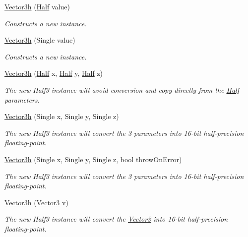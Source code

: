 \begin{DoxyCompactItemize}
\item 
\hyperlink{struct_open_t_k_1_1_vector3h_a30550f0a2648a43e00b622c8196eb6b7}{Vector3h} (\hyperlink{struct_open_t_k_1_1_half}{Half} value)
\begin{DoxyCompactList}\small\item\em Constructs a new instance. \end{DoxyCompactList}\item 
\hyperlink{struct_open_t_k_1_1_vector3h_aa7c357bde0fa5688a72058ddd749411e}{Vector3h} (Single value)
\begin{DoxyCompactList}\small\item\em Constructs a new instance. \end{DoxyCompactList}\item 
\hyperlink{struct_open_t_k_1_1_vector3h_aa61b6383e0f22bdf73bbfc32e9b4f053}{Vector3h} (\hyperlink{struct_open_t_k_1_1_half}{Half} x, \hyperlink{struct_open_t_k_1_1_half}{Half} y, \hyperlink{struct_open_t_k_1_1_half}{Half} z)
\begin{DoxyCompactList}\small\item\em The new Half3 instance will avoid conversion and copy directly from the \hyperlink{struct_open_t_k_1_1_half}{Half} parameters. \end{DoxyCompactList}\item 
\hyperlink{struct_open_t_k_1_1_vector3h_a8bb3531c67918816de6920ee6af2bb4f}{Vector3h} (Single x, Single y, Single z)
\begin{DoxyCompactList}\small\item\em The new Half3 instance will convert the 3 parameters into 16-\/bit half-\/precision floating-\/point. \end{DoxyCompactList}\item 
\hyperlink{struct_open_t_k_1_1_vector3h_ae263a6b3582cc38a791c639ec1e25ef0}{Vector3h} (Single x, Single y, Single z, bool throw\-On\-Error)
\begin{DoxyCompactList}\small\item\em The new Half3 instance will convert the 3 parameters into 16-\/bit half-\/precision floating-\/point. \end{DoxyCompactList}\item 
\hyperlink{struct_open_t_k_1_1_vector3h_af8edd614062cb46df187d0340be606ab}{Vector3h} (\hyperlink{struct_open_t_k_1_1_vector3}{Vector3} v)
\begin{DoxyCompactList}\small\item\em The new Half3 instance will convert the \hyperlink{struct_open_t_k_1_1_vector3}{Vector3} into 16-\/bit half-\/precision floating-\/point. \end{DoxyCompactList}\item 

\end{DoxyCompactItemize}
